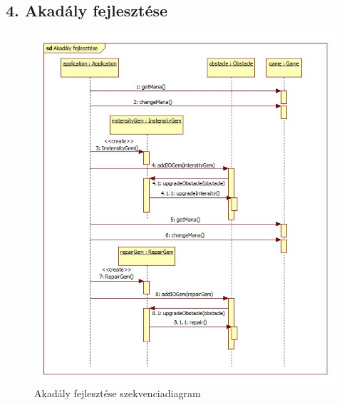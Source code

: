 \subsection{4. Akadály fejlesztése}
\begin{figure}[H]
\begin{center}
\includegraphics[width=17cm]{chapters/chapter05/images/sd_Akadaly_fejlesztese.jpg}
\caption{Akadály fejlesztése szekvenciadiagram}
\label{fig:sd_Akadaly_fejlesztese}
\end{center}
\end{figure}

